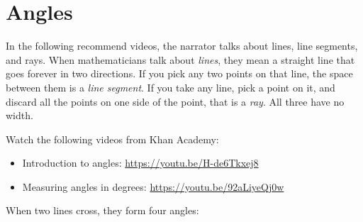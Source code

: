\chapter{Angles}

In the following recommend videos, the narrator talks about
lines, line segments, and rays. When mathematicians talk about
\emph{lines}, they mean a straight line that goes forever in two 
directions. If you pick any two points on that line, the space between 
them is a \emph{line segment}. If you take any line, pick 
a point on it, and discard all the points on one side of the point, that 
is a \emph{ray}. All three have no width.

\begin{center}
\hspace{10mm}
\hspace{6mm}
\end{center}



Watch the following videos from Khan Academy:
\begin{itemize}
\item Introduction to angles: \url{https://youtu.be/H-de6Tkxej8}
\item Measuring angles in degrees: \url{https://youtu.be/92aLiyeQj0w} 
\end{itemize}

When two lines cross, they form four angles:


